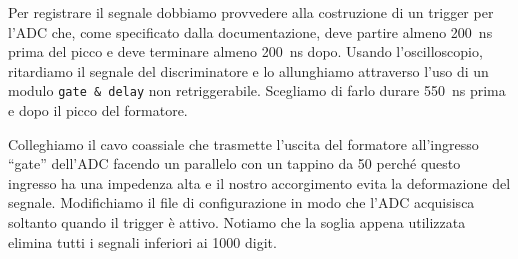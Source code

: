 Per registrare il segnale dobbiamo provvedere alla costruzione di un trigger per l'ADC che, come specificato dalla documentazione, deve partire almeno \SI{200}{ns} prima del picco e deve terminare almeno \SI{200}{ns} dopo. Usando l'oscilloscopio, ritardiamo il segnale del discriminatore e lo allunghiamo attraverso l'uso di un modulo \texttt{gate \& delay} non retriggerabile. Scegliamo di farlo durare \SI{550}{ns} prima e dopo il picco del formatore.

Colleghiamo il cavo coassiale che trasmette l'uscita del formatore all'ingresso ``gate'' dell'ADC facendo un parallelo con un tappino da \SI{50}{\Omega} perché questo ingresso ha una impedenza alta e il nostro accorgimento evita la deformazione del segnale.
Modifichiamo il file di configurazione in modo che l'ADC acquisisca soltanto quando il trigger è attivo. Notiamo che la soglia appena utilizzata elimina tutti i segnali inferiori ai 1000 digit.
